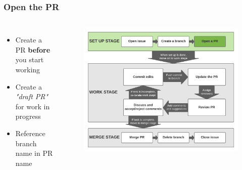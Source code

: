 \documentclass[aspectratio=169]{beamer} %
\begin{document}
\begin{frame}
	\frametitle{Open the PR}
	\begin{columns}[c]
		
		\begin{itemize}
			\setlength\itemsep{1em}
			\item Create a PR \textbf{before} you start working
			\item Create a \textit{"draft PR"} for work in progress
			\item Reference branch name in PR name
		\end{itemize}
		
		\vspace{-.75cm}
		\begin{figure}
			\centering
			\includegraphics[width=\textwidth]{./img/branch-pr-merge-cycle-S1-3.png}
		\end{figure}
		
	\end{columns}
\end{frame}
\end{document}
